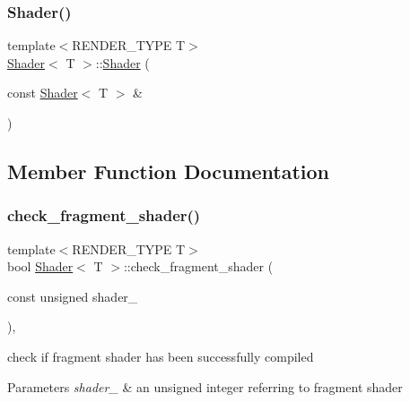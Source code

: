 \subsubsection{\texorpdfstring{Shader()}{Shader()}\hspace{0.1cm}{\footnotesize\ttfamily [4/4]}}
{\footnotesize\ttfamily template$<$R\+E\+N\+D\+E\+R\+\_\+\+T\+Y\+PE T$>$ \\
\mbox{\hyperlink{classShader}{Shader}}$<$ T $>$\+::\mbox{\hyperlink{classShader}{Shader}} (\begin{DoxyParamCaption}\item[{const \mbox{\hyperlink{classShader}{Shader}}$<$ T $>$ \&}]{ }\end{DoxyParamCaption})\hspace{0.3cm}{\ttfamily [delete]}}



\subsection{Member Function Documentation}
\mbox{\label{classShader_af80deea033a7fb48bc162b33056bd7a0}} 
\subsubsection{\texorpdfstring{check\+\_\+fragment\+\_\+shader()}{check\_fragment\_shader()}}
{\footnotesize\ttfamily template$<$R\+E\+N\+D\+E\+R\+\_\+\+T\+Y\+PE T$>$ \\
bool \mbox{\hyperlink{classShader}{Shader}}$<$ T $>$\+::check\+\_\+fragment\+\_\+shader (\begin{DoxyParamCaption}\item[{const unsigned}]{shader\+\_\+ }\end{DoxyParamCaption})\hspace{0.3cm}{\ttfamily [inline]}, {\ttfamily [protected]}}



check if fragment shader has been successfully compiled 


\begin{DoxyParams}{Parameters}
{\em shader\+\_\+} & an unsigned integer referring to fragment shader \\
\hline
\end{DoxyParams}
\mbox{\label{classShader_aed672a8004b14078f149603eeb1a3f5a}} 
